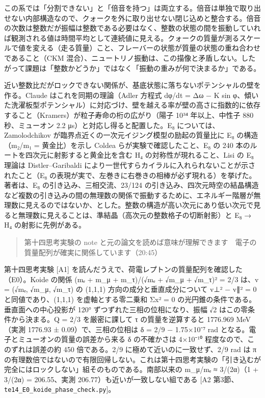 \documentclass[
  a4paper,
]{ltjsarticle}
\begin{document}
この系では「分割できない」と「倍音を持つ」は両立する。倍音は単独で取り出せない内部構造なので、クォークを外に取り出せない閉じ込めと整合する。倍音の次数は整数だが振幅は整数である必要はなく、整数の状態の間を振動していれば観測される値は時間平均として連続値に見える。クォークの質量が測るスケールで値を変える（走る質量）こと、フレーバーの状態が質量の状態の重ね合わせであること（CKM
混合）、ニュートリノ振動は、この描像と矛盾しない。したがって課題は「整数かどうか」ではなく「振動の重みが何で決まるか」である。

近い整数比だがロックできない関係が、基底状態に落ちないポテンシャルの壁を作る。Claude
はこれを同期の理論（Adler 方程式 dφ/dt = Δω − K sin
φ、傾いた洗濯板型ポテンシャル）に対応づけ、壁を越える率が壁の高さに指数的に依存すること（Kramers）が粒子寿命の桁の広がり（陽子
10³⁴ 年以上、中性子 880 秒、ミューオン 2.2
μs）と対応し得ると配置した。E₈ については、Zamolodchikov
が臨界点近くの一次元イジング模型の励起の質量比に E₈ の構造（m₂/m₁ =
黄金比）を示し Coldea らが実験で確認したこと、E₈ の 240
本のルートを四次元に射影すると黄金比を含む H₄ の対称性が現れること、Lisi
の E₈ 理論は Distler--Garibaldi
により一世代すらカイラルに入れられないことが示されたこと（E₈
の表現が実で、左巻きに右巻きの相棒が必ず現れる）を挙げた。著者は、E₈
の引き込み、三相交流、23/124
の引き込み、四次元時空の結晶構造など複数の引き込みの間の無理数の関係で振動するために、エネルギー階層が無理数に見えるのではないか、とした。整数の構造が高い次元にあり低い次元で見ると無理数に見えることは、準結晶（高次元の整数格子の切断射影）と
E₈ → H₄ の射影に先例がある。

\begin{quote}
第十四思考実験の note
と元の論文を読めば意味が理解できます　電子の質量配列が確実に関係しています（20:45）
\end{quote}

第十四思考実験 {[}A1{]}
を読んだうえで、荷電レプトンの質量配列を確認した（E0）。Koide の関係 (mₑ
+ m\_μ + m\_τ)/(√mₑ + √m\_μ + √m\_τ)² = 2/3 は、v = (√mₑ, √m\_μ, √m\_τ)
の (1,1,1) 方向の成分と垂直成分について \textbar v⊥\textbar² −
\textbar v∥\textbar² = 0 と同値であり、(1,1,1) を虚軸とする零二乗和 Σx²
= 0 の光円錐の条件である。垂直面への中心投影が 120°
ずつずれた三相の位相になり、振幅 √2 はこの零条件から決まる。Q = 2/3
を厳密に課して τ の質量を逆算すると 1776.969 MeV（実測 1776.93 ±
0.09）で、三相の位相は δ = 2/9 − 1.75×10⁻⁷ rad
となる。電子とミューオンの質量の誤差から来る δ の不確かさは 4×10⁻¹⁰
程度なので、このずれは誤差の約 450 倍である。2/9
に極めて近いのに一致せず、2/9 rad は π
の有理数倍ではないので有限回帰しない。これは第十四思考実験の「引き込むが完全にはロックしない」組そのものである。南部以来の
m\_μ/mₑ ≈ 3/(2α)（1 + 3/(2α) = 206.55、実測
206.77）も近いが一致しない組である {[}A2
第3節、\texttt{te14\_\allowbreak{}E0\_\allowbreak{}koide\_\allowbreak{}phase\_\allowbreak{}check.py}{]}。
\end{document}
